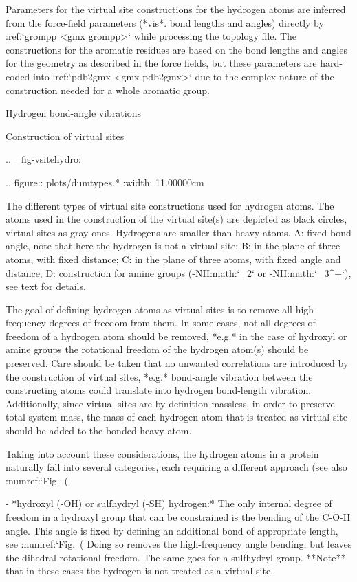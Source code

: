 Parameters for the virtual site constructions for the hydrogen atoms are
inferred from the force-field parameters (*vis*. bond lengths and
angles) directly by :ref:`grompp <gmx grompp>` while processing the topology file. The
constructions for the aromatic residues are based on the bond lengths
and angles for the geometry as described in the force fields, but these
parameters are hard-coded into :ref:`pdb2gmx <gmx pdb2gmx>` due to the complex nature of the
construction needed for a whole aromatic group.

Hydrogen bond-angle vibrations
^^^^^^^^^^^^^^^^^^^^^^^^^^^^^^

Construction of virtual sites
~~~~~~~~~~~~~~~~~~~~~~~~~~~~~

.. _fig-vsitehydro:

.. figure:: plots/dumtypes.*
   :width: 11.00000cm

   The different types of virtual site constructions used for hydrogen
   atoms. The atoms used in the construction of the virtual site(s) are
   depicted as black circles, virtual sites as gray ones. Hydrogens are
   smaller than heavy atoms. A: fixed bond angle, note
   that here the hydrogen is not a virtual site; B: in
   the plane of three atoms, with fixed distance; C: in
   the plane of three atoms, with fixed angle and distance;
   D: construction for amine groups
   (-NH:math:`_2` or -NH:math:`_3^+`),
   see text for details.

The goal of defining hydrogen atoms as virtual sites is to remove all
high-frequency degrees of freedom from them. In some cases, not all
degrees of freedom of a hydrogen atom should be removed, *e.g.* in the
case of hydroxyl or amine groups the rotational freedom of the hydrogen
atom(s) should be preserved. Care should be taken that no unwanted
correlations are introduced by the construction of virtual sites, *e.g.*
bond-angle vibration between the constructing atoms could translate into
hydrogen bond-length vibration. Additionally, since virtual sites are by
definition massless, in order to preserve total system mass, the mass of
each hydrogen atom that is treated as virtual site should be added to
the bonded heavy atom.

Taking into account these considerations, the hydrogen atoms in a
protein naturally fall into several categories, each requiring a
different approach (see also :numref:`Fig. (%

-  *hydroxyl (-OH) or sulfhydryl (-SH) hydrogen:* 
   The only internal degree of freedom in a hydroxyl group
   that can be constrained is the bending of the C-O-H
   angle. This angle is fixed by defining an additional bond of
   appropriate length, see :numref:`Fig. (%
   Doing so removes the high-frequency angle bending, but leaves the
   dihedral rotational freedom. The same goes for a sulfhydryl group.
   **Note** that in these cases the hydrogen is not treated as a virtual
   site.

